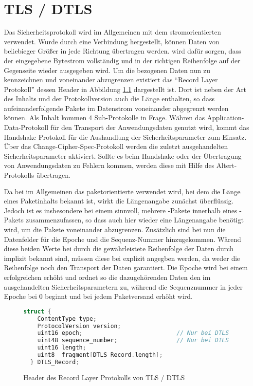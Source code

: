 \chapter{TLS / DTLS}

Das Sicherheitsprotokoll  \cite{rfc5246} wird im Allgemeinen mit dem stromorientierten  verwendet.
Wurde durch  eine Verbindung hergestellt, können Daten von beliebieger Größer in jede Richtung
übertragen werden.  wird dafür sorgen, dass der eingegebene Bytestrom vollständig und in der
richtigen Reihenfolge auf der Gegenseite wieder ausgegeben wird. Um die  bezogenen Daten nun
zu kennzeichnen und voneinander abzugrenzen existiert das "`Record Layer Protokoll"' dessen Header in Abbildung \ref{fig:recordlayer}
dargestellt ist. Dort ist neben der Art des Inhalts und der Protokollversion auch die Länge enthalten, so dass
aufeinanderfolgende Pakete im Datenstrom voneinander abgegrenzt werden können. Als Inhalt kommen 4 Sub-Protokolle
in Frage. Währen das Application-Data-Protokoll für den Transport der Anwendungsdaten genutzt wird, kommt
das Handshake-Protokoll für die Aushandlung der Sicherheitsparameter zum Einsatz. Über das Change-Cipher-Spec-Protokoll
werden die zuletzt ausgehandelten Sicherheitsparameter aktiviert. Sollte es beim Handshake oder der Übertragung
von Anwendungsdaten zu Fehlern kommen, werden diese mit Hilfe des Altert-Protokolls übertragen.

Da bei  \cite{rfc6347} im Allgemeinen das paketorientierte  verwendet wird, bei dem die Länge eines
Paketinhalts bekannt ist, wirkt die Längenangabe zunächst überflüssig. Jedoch ist es insbesondere bei einem
 sinnvoll, mehrere -Pakete innerhalb eines -Pakets zusammenzufassen,
so dass auch hier wieder eine Längenangabe benötigt wird, um die Pakete voneinander abzugrenzen.
Zusätzlich sind bei  nun die Datenfelder für die Epoche und die Sequenz-Nummer hinzugekommen.
Wärend diese beiden Werte bei  durch die gewährleistete Reihenfolge der Daten durch 
implizit bekannt sind, müssen diese bei  explizit angegben werden, da  weder die
Reihenfolge noch den Transport der Daten garantiert. Die Epoche wird bei einem erfolgreichen 
erhöht und ordnet so die dazugehörenden Daten den im  ausgehandelten Sicherheitsparametern zu,
während die Sequenznummer in jeder Epoche bei 0 beginnt und bei jedem Paketversand erhöht wird.

\begin{figure}[ht]
  \centering
  \begin{lstlisting}[language=c]
  struct {
    ContentType type;
    ProtocolVersion version;
    uint16 epoch;                           // Nur bei DTLS
    uint48 sequence_number;                 // Nur bei DTLS
    uint16 length;
    uint8  fragment[DTLS_Record.length];
  } DTLS_Record;
  \end{lstlisting}
  \caption{Header des Record Layer Protokolls von TLS / DTLS}
  \label{fig:recordlayer}
\end{figure}

